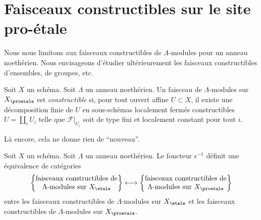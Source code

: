 \section{Faisceaux constructibles sur le site pro-\'etale}
\label{section-constructible}

\noindent
Nous nous limitons aux faisceaux constructibles de $\Lambda$-modules pour un
anneau noethérien. Nous envisageons d'étudier ultérieurement les faisceaux constructibles
d'ensembles, de groupes, etc.

\begin{definition}
\label{definition-constructible}
Soit $X$ un schéma.
Soit $\Lambda$ un anneau noethérien. Un faisceau de $\Lambda$-modules
sur $X_\proetale$ est {\it constructible} si, pour tout ouvert affine
$U \subset X$, il existe une décomposition finie
de $U$ en sous-schémas localement fermés constructibles
$U = \coprod_i U_i$ telle que
$\mathcal{F}|_{U_i}$ soit de type fini et localement constant pour tout $i$.
\end{definition}

\noindent
Là encore, cela ne donne rien de ``nouveau''.

\begin{lemma}
\label{lemma-compare-constructible}
Soit $X$ un schéma. Soit $\Lambda$ un anneau noethérien.
Le foncteur $\epsilon^{-1}$ définit une équivalence de catégories
$$
\left\{
\begin{matrix}
\text{faisceaux constructibles de}\\
\Lambda\text{-modules sur }X_\etale\\
\end{matrix}
\right\}
\longleftrightarrow
\left\{
\begin{matrix}
\text{faisceaux constructibles de}\\
\Lambda\text{-modules sur }X_\proetale\\
\end{matrix}
\right\}
$$
entre les faisceaux constructibles de $\Lambda$-modules sur $X_\etale$
et les faisceaux constructibles de $\Lambda$-modules sur $X_\proetale$.
\end{lemma}

